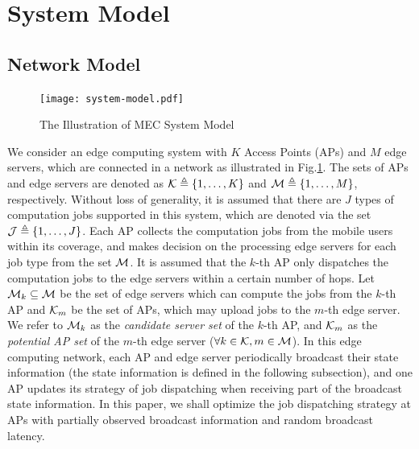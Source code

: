 \section{System Model}
\subsection{Network Model}
\begin{figure}[ht]
    \centering
    \texttt{[image: system-model.pdf]}
    \caption{The Illustration of MEC System Model}
    \label{fig:system}
\end{figure}

We consider an edge computing system with $K$ Access Points (APs) and $M$ edge servers, which are connected in a network as illustrated in Fig.\ref{fig:system}.
The sets of APs and edge servers are denoted as $\mathcal{K} \triangleq \{1,\dots,K\}$ and $\mathcal{M} \triangleq \{1,\dots,M\}$, respectively.
Without loss of generality, it is assumed that there are $J$ types of computation jobs supported in this system, which are denoted via the set $\mathcal{J} \triangleq \{1,\dots,J\}$.
Each AP collects the computation jobs from the mobile users within its coverage, and makes decision on the processing edge servers for each job type from the set $\mathcal{M}$.
It is assumed that the $k$-th AP only dispatches the computation jobs to the edge servers within a certain number of hops.
Let $\mathcal{M}_{k} \subseteq \mathcal{M}$ be the set of edge servers which can compute the jobs from the $k$-th AP and $\mathcal{K}_{m}$ be the set of APs, which may upload jobs to the $m$-th edge server.
We refer to $\mathcal{M}_{k}$ as the \emph{candidate server set} of the $k$-th AP, and $\mathcal{K}_{m}$ as the \emph{potential AP set} of the $m$-th edge server ($\forall k\in\mathcal{K}, m\in\mathcal{M}$).
In this edge computing network, each AP and edge server periodically broadcast their state information (the state information is defined in the following subsection), and one AP updates its strategy of job dispatching when receiving part of the broadcast state information.
In this paper, we shall optimize the job dispatching strategy at APs with partially observed broadcast information and random broadcast latency.

